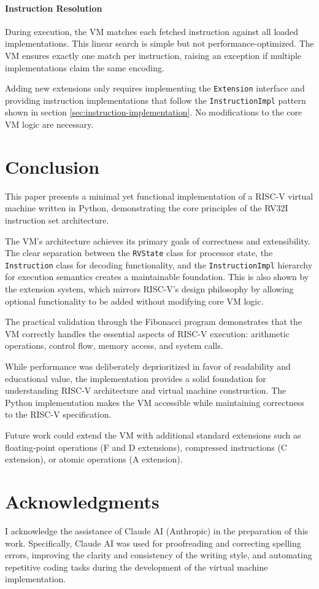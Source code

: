 \documentclass[sigconf]{acmart}
\begin{document}
\paragraph{Instruction Resolution}
During execution, the VM matches each fetched instruction against all loaded implementations. This linear search is simple but not performance-optimized. The VM ensures exactly one match per instruction, raising an exception if multiple implementations claim the same encoding.

Adding new extensions only requires implementing the \texttt{Extension} interface and providing instruction implementations that follow the \texttt{InstructionImpl} pattern shown in section \ref{sec:instruction-implementation}. No modifications to the core VM logic are necessary. 

\section{Conclusion}
This paper presents a minimal yet functional implementation of a RISC-V virtual machine written in Python, demonstrating the core principles of the RV32I instruction set architecture.

The VM's architecture achieves its primary goals of correctness and extensibility. The clear separation between the \texttt{RVState} class for processor state, the \texttt{Instruction} class for decoding functionality, and the \texttt{InstructionImpl} hierarchy for execution semantics creates a maintainable foundation. This is also shown by the extension system, which mirrors RISC-V's design philosophy by allowing optional functionality to be added without modifying core VM logic.

The practical validation through the Fibonacci program demonstrates that the VM correctly handles the essential aspects of RISC-V execution: arithmetic operations, control flow, memory access, and system calls.

While performance was deliberately deprioritized in favor of readability and educational value, the implementation provides a solid foundation for understanding RISC-V architecture and virtual machine construction. The Python implementation makes the VM accessible while maintaining correctness to the RISC-V specification.

Future work could extend the VM with additional standard extensions such as floating-point operations (F and D extensions), compressed instructions (C extension), or atomic operations (A extension).

\section*{Acknowledgments}
I acknowledge the assistance of Claude AI (Anthropic) in the preparation of this work. Specifically, Claude AI was used for proofreading and correcting spelling errors, improving the clarity and consistency of the writing style, and automating repetitive coding tasks during the development of the virtual machine implementation.



\end{document}
